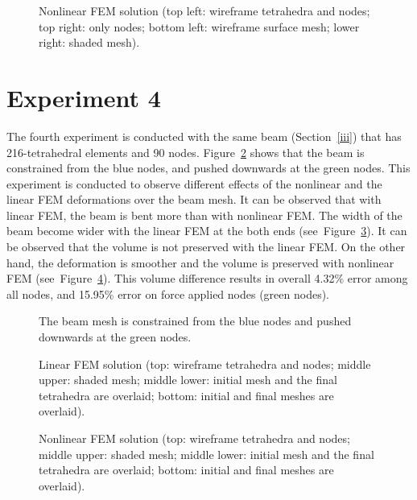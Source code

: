 \begin{figure}[c]
\centerline{}
\caption{Nonlinear FEM solution (top left: wireframe tetrahedra and nodes; top right: only nodes; bottom left: wireframe surface mesh; lower right: shaded mesh).}
\label{fig:fig10}
\end{figure}

\clearpage

\section{Experiment 4}
\label{iv}

The fourth experiment is conducted with the same beam (Section~\ref{iii}) that has 216-tetrahedral elements and 90 nodes. Figure~\ref{fig:fig11} shows that the beam is constrained from the blue nodes, and pushed downwards at the green nodes. This experiment is conducted to observe different effects of the nonlinear and the linear FEM deformations over the beam mesh.
It can be observed that with linear FEM, the beam is bent more than with nonlinear FEM. The width of the beam become wider with the linear FEM at the both ends (see~Figure~\ref{fig:fig12}). It can be observed that the volume is not preserved with the linear FEM. On the other hand, the deformation is smoother and the volume is preserved with nonlinear FEM (see~Figure~\ref{fig:fig13}). This volume difference results in overall 4.32\% error among all nodes, and 15.95\% error on force applied nodes (green nodes).

\begin{figure}[h]
\centerline{}
\caption{The beam mesh is constrained from the blue nodes and pushed downwards at the green nodes.}
\label{fig:fig11}
\end{figure}

\begin{figure}[c]
\centerline{}
\caption{Linear FEM solution (top: wireframe tetrahedra and nodes; middle upper: shaded mesh; middle lower: initial mesh and the final tetrahedra are overlaid; bottom: initial and final meshes are overlaid).}
\label{fig:fig12}
\end{figure}

\begin{figure}[c]
\centerline{}
\caption{Nonlinear FEM solution (top: wireframe tetrahedra and nodes; middle upper: shaded mesh; middle lower: initial mesh and the final tetrahedra are overlaid; bottom: initial and final meshes are overlaid).}
\label{fig:fig13}
\end{figure}

